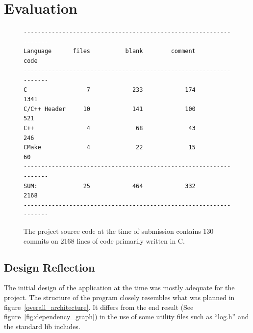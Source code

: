 \chapter{Evaluation}

\begin{figure}
\centering
\begin{verbatim}
------------------------------------------------------------------
Language      files          blank        comment           code
------------------------------------------------------------------
C                 7            233            174           1341
C/C++ Header     10            141            100            521
C++               4             68             43            246
CMake             4             22             15             60
------------------------------------------------------------------
SUM:             25            464            332           2168
------------------------------------------------------------------
\end{verbatim}
\caption[Project statistics]{The project source code at the time of submission contains 130 commits on 2168 lines of code primarily written in C.}
\label{fig:my_label}
\end{figure}

\section{Design Reflection}
The initial design of the application at the time was mostly adequate for the project. The structure of the program closely resembles what was planned in figure~\ref{overall_architecture}. It differs from the end result (See figure~\ref{fig:dependency_graph}) in the use of some utility files such as ``log.h'' and the standard lib includes. 

